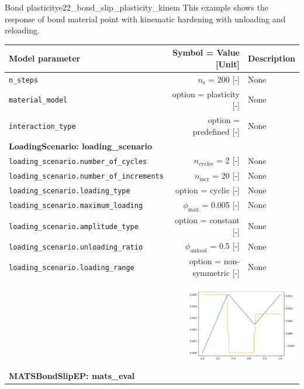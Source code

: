 \documentclass[main.tex]{subfiles}
\begin{document}
\begin{bmcsex}{Bond plasticity}{e22_bond_slip_plasticity_kinem}
\noindent This example shows the response of bond material point 
    with kinematic hardening with unloading and reloading.
     \\
\begin{center}
            
{\scriptsize 
\begin{longtable}{lrp{4cm}}\toprule
\textbf{\textsf{Model parameter}} 
& 
\textbf{\textsf{Symbol = Value [Unit]}} 
&
\textbf{\textsf{Description}}  \\\midrule \midrule
\texttt{n\_steps} & $n_\mathrm{s}$ = 200 [-] & {\footnotesize None}  \\
            \texttt{material\_model} & option = plasticity [-] & {\footnotesize None}  \\
            \texttt{interaction\_type} & option = predefined [-] & {\footnotesize None}  \\
            \midrule
\multicolumn{3}{l}{\textbf{\textsf{LoadingScenario: loading\_scenario}}}\\

\texttt{loading\_scenario.number\_of\_cycles} & $n_\mathrm{cycles}$ = 2 [-] & {\footnotesize None}  \\
            \texttt{loading\_scenario.number\_of\_increments} & $n_{\mathrm{incr}}$ = 20 [-] & {\footnotesize None}  \\
            \texttt{loading\_scenario.loading\_type} & option = cyclic [-] & {\footnotesize None}  \\
            \texttt{loading\_scenario.maximum\_loading} & $\phi_{\max}$ = 0.005 [-] & {\footnotesize None}  \\
            \texttt{loading\_scenario.amplitude\_type} & option = constant [-] & {\footnotesize None}  \\
            \texttt{loading\_scenario.unloading\_ratio} & $\phi_{\mathrm{unload}}$ = 0.5 [-] & {\footnotesize None}  \\
            \texttt{loading\_scenario.loading\_range} & option = non-symmetric [-] & {\footnotesize None}  \\
            
\multicolumn{3}{r}{\includegraphics[width=5cm]{examples/e22_bond_slip_plasticity_kinem/fig_loading_scenario.pdf}}\\
\midrule
\multicolumn{3}{l}{\textbf{\textsf{MATSBondSlipEP: mats\_eval}}}\\


\end{longtable}}
\end{center}
\end{bmcsex}
\end{document}
